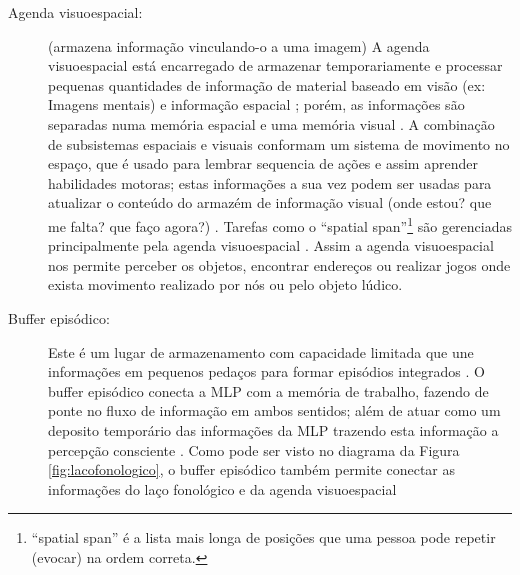 \begin{description}
\item[Agenda visuoespacial:] (armazena informação vinculando-o a uma imagem)
\label{reflabel:visuoespacial}
A agenda visuoespacial está encarregado de armazenar temporariamente  e processar pequenas quantidades de informação
de material baseado em visão (ex: Imagens mentais) e informação espacial
\cite[pp. 678]{spreen2006compendium} \cite[pp. 124]{pake2019psicologia};
porém, as informações são separadas numa memória  espacial e uma memória visual \cite[pp. 124]{pake2019psicologia}.
A combinação de  subsistemas espaciais e visuais conformam um sistema de movimento no espaço, 
que é usado para lembrar sequencia de ações e assim aprender habilidades motoras;
estas informações a sua vez podem ser usadas para atualizar o conteúdo do armazém de informação visual
(onde estou? que me falta? que faço agora?)
\cite[pp. 274]{braisby2012cognitive} \cite[pp. 125]{pake2019psicologia}.
Tarefas como o ``spatial span''\footnote{``spatial span'' é a lista mais longa de posições que uma 
pessoa pode repetir (evocar) na ordem correta.} 
são gerenciadas principalmente pela agenda visuoespacial 
\cite[pp. 678]{spreen2006compendium}.
Assim a agenda visuoespacial nos permite perceber os objetos, 
encontrar endereços ou realizar jogos onde exista movimento realizado por nós ou pelo objeto lúdico. 


\item[Buffer episódico:] 
Este é um lugar de armazenamento com capacidade limitada que une informações em 
pequenos pedaços para formar episódios integrados 
\cite[pp. 678]{spreen2006compendium} \cite[pp. 126]{pake2019psicologia}.
O buffer episódico conecta a MLP com a memória de trabalho, 
fazendo de ponte no fluxo de informação em ambos sentidos;
além de atuar como um deposito temporário das informações da MLP
trazendo esta informação a percepção consciente
\cite[pp. 126]{pake2019psicologia} \cite[pp. 283-284]{braisby2012cognitive}.
Como pode ser visto no diagrama da Figura \ref{fig:lacofonologico}, 
o buffer episódico também permite conectar as informações do laço fonológico e da agenda visuoespacial
\end{description}
